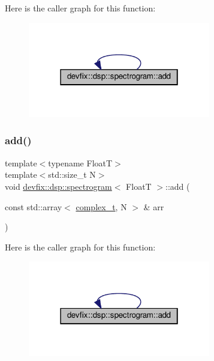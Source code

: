 Here is the caller graph for this function\+:
\nopagebreak
\begin{figure}[H]
\begin{center}
\leavevmode
\includegraphics[width=226pt]{structdevfix_1_1dsp_1_1spectrogram_a2ad71f3d58619d29de6e655ddc1c2085_icgraph}
\end{center}
\end{figure}
\mbox{\label{structdevfix_1_1dsp_1_1spectrogram_afd4fde92b022e1a0a98fa06da03d6e3c}} 
\subsubsection{\texorpdfstring{add()}{add()}\hspace{0.1cm}{\footnotesize\ttfamily [3/3]}}
{\footnotesize\ttfamily template$<$typename FloatT$>$ \\
template$<$std\+::size\+\_\+t N$>$ \\
void \hyperlink{structdevfix_1_1dsp_1_1spectrogram}{devfix\+::dsp\+::spectrogram}$<$ FloatT $>$\+::add (\begin{DoxyParamCaption}\item[{const std\+::array$<$ \hyperlink{structdevfix_1_1dsp_1_1spectrogram_a222d1efa23713b334a001e625594b4d4}{complex\+\_\+t}, N $>$ \&}]{arr }\end{DoxyParamCaption})\hspace{0.3cm}{\ttfamily [inline]}}

Here is the caller graph for this function\+:
\nopagebreak
\begin{figure}[H]
\begin{center}
\leavevmode
\includegraphics[width=226pt]{structdevfix_1_1dsp_1_1spectrogram_afd4fde92b022e1a0a98fa06da03d6e3c_icgraph}
\end{center}
\end{figure}
\mbox{\label{structdevfix_1_1dsp_1_1spectrogram_a52a5bc587a41bb8606c7766c58177f57}} 
